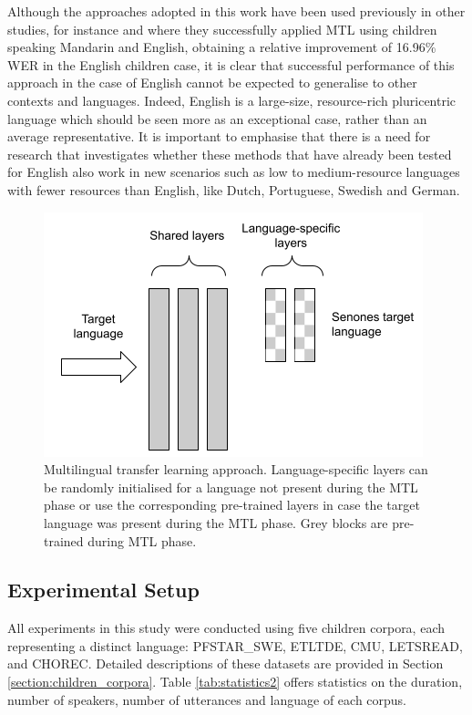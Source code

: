 Although the approaches adopted in this work have been used previously in other studies, for instance \cite{TransferLF} and \cite{2019multi} where they successfully applied \ac{MTL} using children speaking  Mandarin and English, obtaining a relative improvement of 16.96\% \ac{WER} in the English children case, it is clear that successful performance of this approach in the case of English cannot be expected to generalise to other contexts and languages.  
Indeed, English is a large-size, resource-rich pluricentric language which should be seen more as an exceptional case, rather than an average representative. It is important to emphasise that there is a need for research that investigates whether these methods that have already been tested for English also work in new scenarios such as low to medium-resource languages with fewer resources than English, like Dutch, Portuguese, Swedish and German. 

\begin{figure}[t]
\begin{center}
\includegraphics[scale=0.5]{imgs/Ours_final.png}
\caption{Multilingual transfer learning approach. Language-specific layers can be randomly initialised for a language not present during the MTL phase or use the corresponding pre-trained layers in case the target language was present during the MTL phase. Grey blocks are pre-trained during MTL phase.}
\label{fig:MLTL1}
\end{center}
\end{figure}


\subsection{Experimental Setup}
\label{section:corpus}
All experiments in this study were conducted using five children corpora, each representing a distinct language: PFSTAR\_SWE, ETLTDE, CMU, LETSREAD, and CHOREC. Detailed descriptions of these datasets are provided in Section \ref{section:children_corpora}. Table \ref{tab:statistics2} offers statistics on the duration, number of speakers, number of utterances and language of each corpus.

